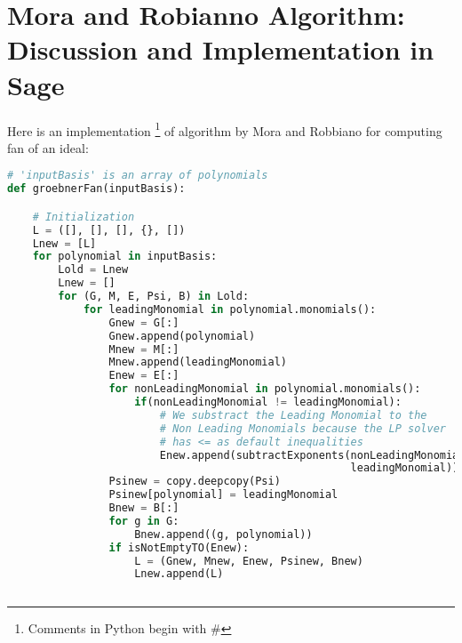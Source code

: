 \section{Mora and Robianno Algorithm:
  Discussion and Implementation in Sage}

Here is an implementation \footnote{Comments in Python begin with \#} of algorithm
by Mora and Robbiano for computing \grob fan of an ideal:

\begin{lstlisting}[language=Python]
# 'inputBasis' is an array of polynomials
def groebnerFan(inputBasis):

    # Initialization
    L = ([], [], [], {}, [])
    Lnew = [L]
    for polynomial in inputBasis:
        Lold = Lnew
        Lnew = []
        for (G, M, E, Psi, B) in Lold:
            for leadingMonomial in polynomial.monomials():
                Gnew = G[:]
                Gnew.append(polynomial)
                Mnew = M[:]
                Mnew.append(leadingMonomial)
                Enew = E[:]
                for nonLeadingMonomial in polynomial.monomials():
                    if(nonLeadingMonomial != leadingMonomial):
                        # We substract the Leading Monomial to the
                        # Non Leading Monomials because the LP solver
                        # has <= as default inequalities
                        Enew.append(subtractExponents(nonLeadingMonomial,
                                                      leadingMonomial))
                Psinew = copy.deepcopy(Psi)
                Psinew[polynomial] = leadingMonomial
                Bnew = B[:]
                for g in G:
                    Bnew.append((g, polynomial))
                if isNotEmptyTO(Enew):
                    L = (Gnew, Mnew, Enew, Psinew, Bnew)
                    Lnew.append(L)
                    

\end{lstlisting}

